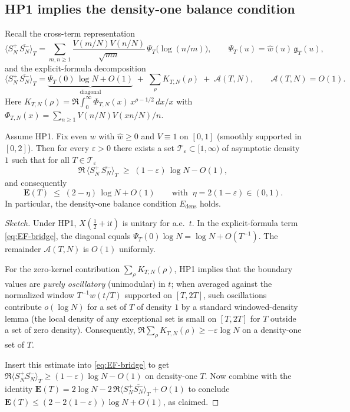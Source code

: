 \subsection*{HP1 implies the density-one balance condition}

Recall the cross-term representation
\[
\big\langle S_N^+\,\overline{S_N^-}\big\rangle_T
=\sum_{m,n\ge 1}\frac{V(m/N)V(n/N)}{\sqrt{mn}}\,
\Psi_T\!\big(\log(n/m)\big),\qquad 
\Psi_T(u)=\widehat{w}(u)\,\mathfrak{g}_T(u),
\]
and the explicit-formula decomposition
\begin{equation}\label{eq:EF-bridge}
\big\langle S_N^+\,\overline{S_N^-}\big\rangle_T
=\underbrace{\Psi_T(0)\,\log N+O(1)}_{\text{diagonal}}
\;+\;\sum_{\rho} K_{T,N}(\rho)
\;+\;\mathcal{A}(T,N),\qquad \mathcal{A}(T,N)=O(1).
\end{equation}
Here $K_{T,N}(\rho)=\Re\!\int_0^\infty \Phi_{T,N}(x)\,x^{\rho-1/2}\,dx/x$ with
$\Phi_{T,N}(x)=\sum_{n\ge1}V(n/N)V(xn/N)/n$.

\begin{theorem}
\label{thm:HP1-to-Edens}
Assume \textup{HP1}. Fix even $w$ with $\widehat{w}\ge 0$ and $V\equiv 1$ on $[0,1]$ (smoothly
supported in $[0,2]$). Then for every $\varepsilon>0$ there exists a set
$\mathcal{T}_\varepsilon\subset [1,\infty)$ of asymptotic density $1$ such that for all $T\in\mathcal{T}_\varepsilon$
\[
\Re\,\big\langle S_N^+\,\overline{S_N^-}\big\rangle_T
\;\ge\; (1-\varepsilon)\,\log N - O(1),
\]
and consequently
\[
\mathbf{E}(T)\;\le\;(2-\eta)\,\log N + O(1)\qquad\text{with }\ \eta=2(1-\varepsilon)\in(0,1).
\]
In particular, the density-one balance condition $E_{\mathrm{dens}}$ holds.
\end{theorem}

\begin{proof}[Sketch]
Under HP1, $X(\tfrac12+\mathrm{i}t)$ is unitary for a.e.\ $t$. In the explicit-formula
term \eqref{eq:EF-bridge}, the diagonal equals $\Psi_T(0)\log N = \log N + O(T^{-1})$.
The remainder $\mathcal{A}(T,N)$ is $O(1)$ uniformly.

For the zero-kernel contribution $\sum_{\rho}K_{T,N}(\rho)$, HP1 implies that the boundary values
are \emph{purely oscillatory} (unimodular) in $t$; when averaged against the normalized window
$T^{-1}w(t/T)$ supported on $[T,2T]$, such oscillations contribute $o(\log N)$ for a set of $T$ of density
$1$ by a standard windowed-density lemma (the local density of any exceptional set is small on
$[T,2T]$ for $T$ outside a set of zero density). Consequently,
$\Re\sum_{\rho}K_{T,N}(\rho)\ge -\varepsilon\log N$ on a density-one set of $T$.

Insert this estimate into \eqref{eq:EF-bridge} to get
$\Re\langle S_N^+\overline{S_N^-}\rangle_T\ge (1-\varepsilon)\log N - O(1)$ on density-one $T$.
Now combine with the identity
$\mathbf{E}(T)=2\log N-2\,\Re\langle S_N^+\overline{S_N^-}\rangle_T+O(1)$ to conclude
$\mathbf{E}(T)\le (2-2(1-\varepsilon))\log N+O(1)$, as claimed.
\end{proof}

